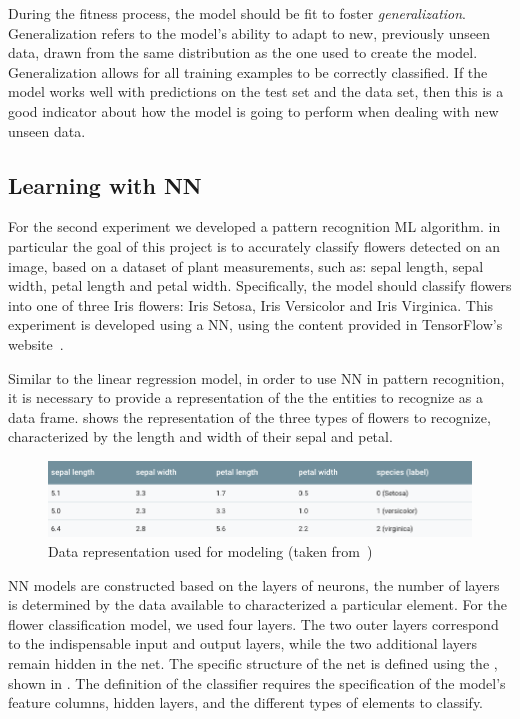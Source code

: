 During the fitness process, the model should be fit to foster \emph{generalization}. 
Generalization refers to the model’s ability to adapt to new, previously unseen data, drawn from the 
same distribution as the one used to create the model.  Generalization allows for all training examples 
to be correctly classified. If the model works well with predictions on the test set and the data set, then 
this is a good indicator about how the model is going to perform when dealing with new unseen data.  


\subsection{Learning with \acl{NN}}

For the second experiment we developed a pattern recognition \ac{ML} algorithm. in particular the 
goal of this project is to accurately classify flowers detected on an image, based on a dataset of 
plant measurements, such as: sepal length, sepal width, petal length and petal width. Specifically, 
the model should classify flowers into one of three Iris flowers: Iris Setosa, Iris Versicolor and Iris 
Virginica. This experiment is developed using a \ac{NN}, using the content provided in TensorFlow's 
website~\cite{tensor18}. 
 
Similar to the linear regression model, in order to use \ac{NN} in pattern recognition, it is necessary 
to provide a representation of the the entities to recognize as a data frame.  shows 
the representation of the three types of flowers to recognize, characterized by the length and width of 
their sepal and petal.

\begin{figure}[htbp]
  \centering
  \includegraphics[width=\textwidth]{images/table}
  \caption{Data representation used for modeling (taken from~\cite{tensor18})}
  \label{fig:object-rep}
\end{figure}

\ac{NN} models are constructed based on the layers of neurons, the number of layers is determined 
by the data available to characterized a particular element. 
For the flower classification model, we used four layers. The two outer layers correspond to the 
indispensable input and output layers, while the two additional layers remain hidden in the net. 
The specific structure of the net is defined using the , shown in 
.  
The definition of the classifier requires the specification of the model's feature columns, hidden layers, 
and the different types of elements to classify.

